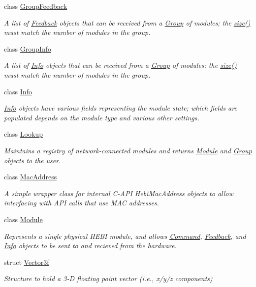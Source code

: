 \begin{DoxyCompactItemize}
class \hyperlink{classhebi_1_1GroupFeedback}{Group\+Feedback}
\begin{DoxyCompactList}\small\item\em A list of \hyperlink{classhebi_1_1Feedback}{Feedback} objects that can be received from a \hyperlink{classhebi_1_1Group}{Group} of modules; the \hyperlink{classhebi_1_1GroupFeedback_adbf31eb50d00db7f286a4888f0d99dc6}{size()} must match the number of modules in the group. \end{DoxyCompactList}\item 
class \hyperlink{classhebi_1_1GroupInfo}{Group\+Info}
\begin{DoxyCompactList}\small\item\em A list of \hyperlink{classhebi_1_1Info}{Info} objects that can be received from a \hyperlink{classhebi_1_1Group}{Group} of modules; the \hyperlink{classhebi_1_1GroupInfo_a197165d1017e42ebbf4f9c527bb1b706}{size()} must match the number of modules in the group. \end{DoxyCompactList}\item 
class \hyperlink{classhebi_1_1Info}{Info}
\begin{DoxyCompactList}\small\item\em \hyperlink{classhebi_1_1Info}{Info} objects have various fields representing the module state; which fields are populated depends on the module type and various other settings. \end{DoxyCompactList}\item 
class \hyperlink{classhebi_1_1Lookup}{Lookup}
\begin{DoxyCompactList}\small\item\em Maintains a registry of network-\/connected modules and returns \hyperlink{classhebi_1_1Module}{Module} and \hyperlink{classhebi_1_1Group}{Group} objects to the user. \end{DoxyCompactList}\item 
class \hyperlink{classhebi_1_1MacAddress}{Mac\+Address}
\begin{DoxyCompactList}\small\item\em A simple wrapper class for internal C-\/\+A\+PI Hebi\+Mac\+Address objects to allow interfacing with A\+PI calls that use M\+AC addresses. \end{DoxyCompactList}\item 
class \hyperlink{classhebi_1_1Module}{Module}
\begin{DoxyCompactList}\small\item\em Represents a single physical H\+E\+BI module, and allows \hyperlink{classhebi_1_1Command}{Command}, \hyperlink{classhebi_1_1Feedback}{Feedback}, and \hyperlink{classhebi_1_1Info}{Info} objects to be sent to and recieved from the hardware. \end{DoxyCompactList}\item 
struct \hyperlink{structhebi_1_1Vector3f}{Vector3f}
\begin{DoxyCompactList}\small\item\em Structure to hold a 3-\/D floating point vector (i.\+e., x/y/z components) \end{DoxyCompactList}\end{DoxyCompactItemize}
